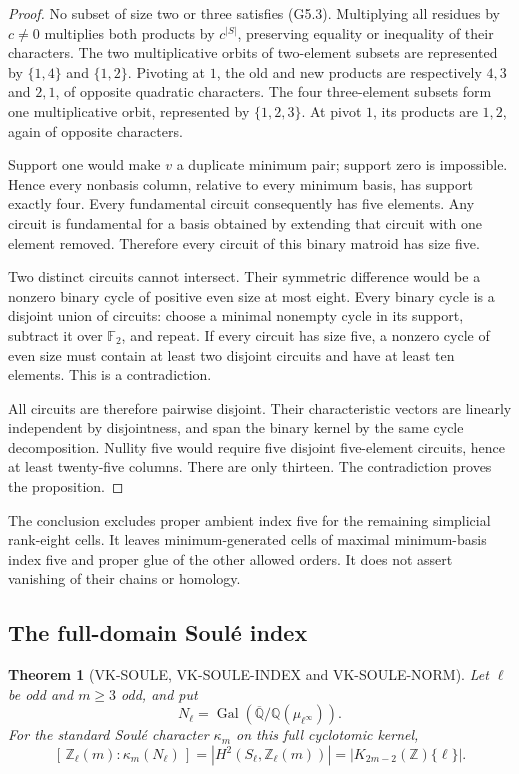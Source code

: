 \documentclass[11pt,a4paper]{article}
\newtheorem{theorem}{Theorem}[section]
\theoremstyle{definition}
\begin{document}
\begin{proof}
No subset of size two or three satisfies (G5.3).
Multiplying all residues by \(c\ne0\) multiplies both
products by \(c^{|S|}\), preserving equality or inequality
of their characters.  The two multiplicative orbits of
two-element subsets are represented by \(\{1,4\}\) and
\(\{1,2\}\).  Pivoting at \(1\), the old and new products
are respectively \(4,3\) and \(2,1\), of opposite quadratic
characters.  The four three-element subsets form one
multiplicative orbit, represented by \(\{1,2,3\}\).
At pivot \(1\), its products are \(1,2\), again of opposite
characters.

Support one would make \(v\) a duplicate minimum pair;
support zero is impossible.  Hence every nonbasis column,
relative to every minimum basis, has support exactly four.
Every fundamental circuit consequently has five elements.
Any circuit is fundamental for a basis obtained by extending
that circuit with one element removed.  Therefore every
circuit of this binary matroid has size five.

Two distinct circuits cannot intersect.  Their symmetric
difference would be a nonzero binary cycle of positive even
size at most eight.  Every binary cycle is a disjoint union
of circuits: choose a minimal nonempty cycle in its support,
subtract it over \(\mathbb F_2\), and repeat.
If every circuit has size five, a nonzero cycle of even size
must contain at least two disjoint circuits and have at
least ten elements.  This is a contradiction.

All circuits are therefore pairwise disjoint.  Their
characteristic vectors are linearly independent by
disjointness, and span the binary kernel by the same
cycle decomposition.  Nullity five would require five
disjoint five-element circuits, hence at least twenty-five
columns.  There are only thirteen.  The contradiction
proves the proposition.
\end{proof}

The conclusion excludes proper ambient index five for the
remaining simplicial rank-eight cells.  It leaves
minimum-generated cells of maximal minimum-basis index five
and proper glue of the other allowed orders.  It does not
assert vanishing of their chains or homology.

\subsection{The full-domain Soul\'e index}

\begin{theorem}[VK-SOULE, VK-SOULE-INDEX and VK-SOULE-NORM]
Let \(\ell\) be odd and \(m\ge3\) odd, and put
\[
 N_\ell=\operatorname{Gal}
   (\overline{\mathbb Q}/\mathbb Q(\mu_{\ell^\infty})).
\]
For the standard Soul\'e character \(\kappa_m\) on this
full cyclotomic kernel,
\[
 [\,\mathbb Z_\ell(m):\kappa_m(N_\ell)\,]
   =|H^2(S_\ell,\mathbb Z_\ell(m))|
   =|K_{2m-2}(\mathbb Z)\{\ell\}|.                   \tag{K18}
\]
\end{theorem}
\end{document}
